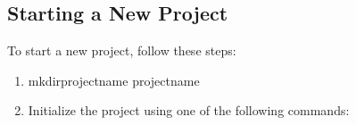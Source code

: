 \documentclass[letterpaper,10pt,english]{sphinxhowto}
\begin{document}
\subsection{Starting a New Project}
\label{\detokenize{getting_started:starting-a-new-project}}
\sphinxAtStartPar
To start a new project, follow these steps:
\begin{enumerate}
%
\item {} \begin{description}
\begin{sphinxVerbatim}[commandchars=\\\{\}]
mkdirproject\PYGZus{}name
project\PYGZus{}name
\end{sphinxVerbatim}

\end{description}

\item {} 
\sphinxAtStartPar
Initialize the project using one of the following commands:

\end{enumerate}
\end{document}
